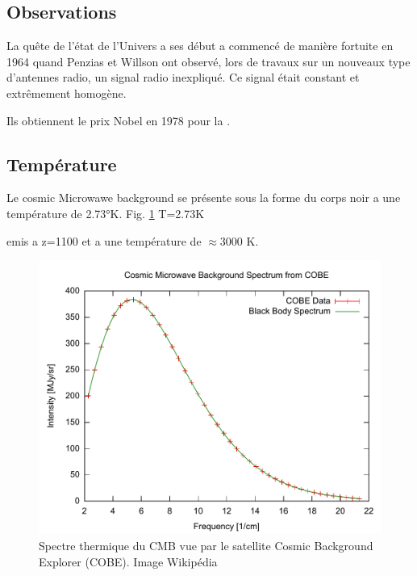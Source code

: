 \subsection{Observations}

La quête de l'état de l'Univers a ses début a commencé de manière fortuite en 1964 quand Penzias et Willson ont observé, lors de travaux sur un nouveaux type d’antennes radio, un signal radio inexpliqué.
Ce signal était constant et extrêmement homogène. 

Ils obtiennent le prix Nobel en 1978 pour la \cite{PenziasWilsonNobel}.


\subsection{Température}
Le cosmic Microwawe background se présente sous la forme du corps noir a une température de 2.73°K.
Fig. \ref{fig:cmb_thermal_spectrum}
T=2.73K

emis a z=1100 et a une température de $\approx 3000$ K.



\begin{figure}[htbp]
        \includegraphics[width=.95\linewidth]{img/01/Cmbr.pdf} 
        \caption{Spectre thermique du CMB vue par le satellite Cosmic Background Explorer (COBE). 
        Image Wikipédia}
 		\label{fig:cmb_thermal_spectrum}
\end{figure}





